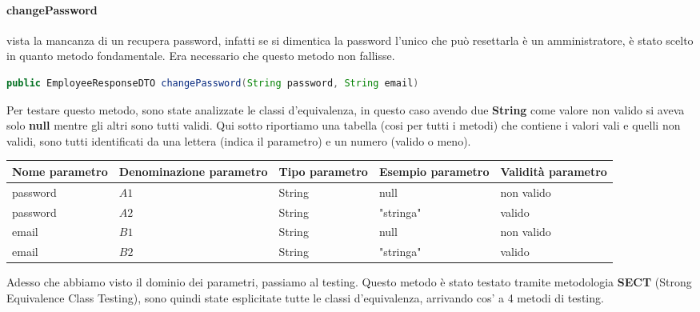 \paragraph{changePassword} vista la mancanza di un recupera password, infatti se si dimentica la password l'unico che può resettarla è un amministratore, è stato scelto in quanto metodo fondamentale. Era necessario che questo metodo non fallisse.
\begin{lstlisting}[language=java]
  public EmployeeResponseDTO changePassword(String password, String email)
\end{lstlisting}
Per testare questo metodo, sono state analizzate le classi d'equivalenza, in questo caso avendo due \textbf{String} come valore non valido si aveva solo \textbf{null} mentre gli altri sono tutti validi.
Qui sotto riportiamo una tabella (cosi per tutti i metodi) che contiene i valori vali e quelli non validi, sono tutti identificati da una lettera (indica il parametro) e un numero (valido o meno).
\begin{table}[H]
  \centering
  \begin{tabular}{|p{2cm}|p{3cm}|p{2cm}|p{2cm}|p{2cm}|}
    \hline
    \rowcolor{green!10}
    \textbf{Nome parametro} & \textbf{Denominazione parametro} & \textbf{Tipo parametro} & \textbf{Esempio parametro} & \textbf{Validità parametro} \\
    \hline
    \rowcolor{black!10}
    password                & $A1$                             & String                  & null                       & non valido                  \\
    password                & $A2$                             & String                  & "stringa"                  & valido                      \\
    \hline
    \rowcolor{black!10}
    email                   & $B1$                             & String                  & null                       & non valido                  \\
    email                   & $B2$                             & String                  & "stringa"                  & valido                      \\
    \hline
  \end{tabular}
\end{table}
Adesso che abbiamo visto il dominio dei parametri, passiamo al testing. Questo metodo è stato testato tramite metodologia \textbf{SECT} (Strong Equivalence Class Testing), sono quindi state esplicitate tutte le classi d'equivalenza, arrivando cos' a 4 metodi di testing.
